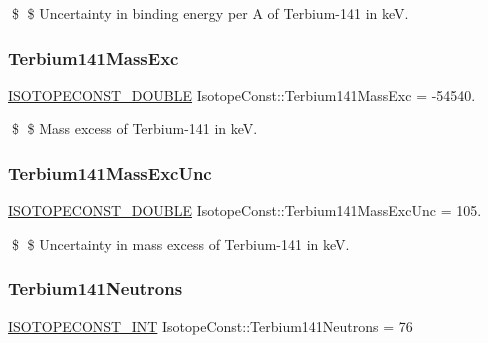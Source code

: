 \$ \$ Uncertainty in binding energy per A of Terbium-\/141 in keV. \mbox{\label{group___isotope_const-_terbium-_tb141_gad7102b27ee67287bea20c4fb49e7e2db}} 
\subsubsection{\texorpdfstring{Terbium141\+Mass\+Exc}{Terbium141MassExc}}
{\footnotesize\ttfamily \mbox{\hyperlink{group___isotope_const-_macros_ga8f45a7272ce02c0b4c65c44636ed719a}{I\+S\+O\+T\+O\+P\+E\+C\+O\+N\+S\+T\+\_\+\+D\+O\+U\+B\+LE}} Isotope\+Const\+::\+Terbium141\+Mass\+Exc = -\/54540.}

\$ \$ Mass excess of Terbium-\/141 in keV. \mbox{\label{group___isotope_const-_terbium-_tb141_ga40fa51a783046f7f925813c83ce3eb2d}} 
\subsubsection{\texorpdfstring{Terbium141\+Mass\+Exc\+Unc}{Terbium141MassExcUnc}}
{\footnotesize\ttfamily \mbox{\hyperlink{group___isotope_const-_macros_ga8f45a7272ce02c0b4c65c44636ed719a}{I\+S\+O\+T\+O\+P\+E\+C\+O\+N\+S\+T\+\_\+\+D\+O\+U\+B\+LE}} Isotope\+Const\+::\+Terbium141\+Mass\+Exc\+Unc = 105.}

\$ \$ Uncertainty in mass excess of Terbium-\/141 in keV. \mbox{\label{group___isotope_const-_terbium-_tb141_gac15ce169569eae0de0e402cd1c848fcf}} 
\subsubsection{\texorpdfstring{Terbium141\+Neutrons}{Terbium141Neutrons}}
{\footnotesize\ttfamily \mbox{\hyperlink{group___isotope_const-_macros_ga5f18360b3e99483a35c32d789e62621c}{I\+S\+O\+T\+O\+P\+E\+C\+O\+N\+S\+T\+\_\+\+I\+NT}} Isotope\+Const\+::\+Terbium141\+Neutrons = 76}

